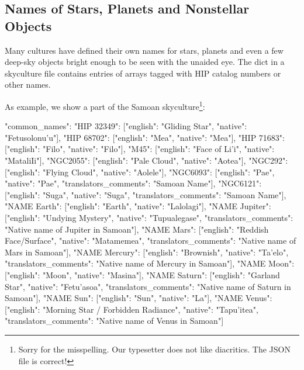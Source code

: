 






\subsection{Names of Stars, Planets and Nonstellar Objects}
\label{sec:skycultures:starnames}
\label{SC:common_names}

Many cultures have defined their own names for stars, planets and even a few deep-sky objects bright enough to be seen with the unaided eye. 
The  dict in a skyculture file  contains entries of arrays tagged with HIP catalog numbers or other names.

As example, we show a part of the Samoan skyculture\footnote{Sorry for the misspelling. Our typesetter does not like diacritics. The JSON file is correct!}:
\begin{jsonfile}[\scriptsize]
"common_names": {
    "HIP 32349": [{"english": "Gliding Star", "native": "Fetusolonu'u"}],
    "HIP 68702": [{"english": "Mea", "native": "Mea"}],
    "HIP 71683": [{"english": "Filo", "native": "Filo"}],
    "M45": [{"english": "Face of Li'i", "native": "MataliIi"}],
    "NGC2055": [{"english": "Pale Cloud", "native": "Aotea"}],
    "NGC292": [{"english": "Flying Cloud", "native": "Aolele"}],
    "NGC6093": [{"english": "Pae", "native": "Pae", "translators_comments": "Samoan Name"}],
    "NGC6121": [{"english": "Suga", "native": "Suga", "translators_comments": "Samoan Name"}],
    "NAME Earth": [{"english": "Earth", "native": "Lalolagi"}],
    "NAME Jupiter": [{"english": "Undying Mystery", 
	                  "native": "Tupualegase", 
					  "translators_comments": "Native name of Jupiter in Samoan"}],
    "NAME Mars": [{"english": "Reddish Face/Surface", 
	               "native": "Matamemea", 
				   "translators_comments": "Native name of Mars in Samoan"}],
    "NAME Mercury": [{"english": "Brownish", 
	                  "native": "Ta'elo", 
					  "translators_comments": "Native name of Mercury in Samoan"}],
    "NAME Moon": [{"english": "Moon", "native": "Masina"}],
    "NAME Saturn": [{"english": "Garland Star", "native": "Fetu'asoa", 
	                 "translators_comments": "Native name of Saturn in Samoan"}],
    "NAME Sun": [{"english": "Sun", "native": "La"}],
    "NAME Venus": [{"english": "Morning Star / Forbidden Radiance", 
					"native": "Tapu'itea", 
	                "translators_comments": "Native name of Venus in Samoan"}]
  }
\end{jsonfile}

